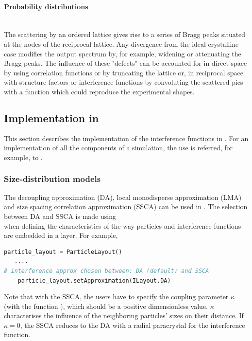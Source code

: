 \paragraph{Probability distributions} \mbox{}\\
The scattering by an ordered lattice gives rise to a series of Bragg peaks situated at the nodes of the reciprocal lattice. Any divergence from the ideal crystalline case modifies the output spectrum by, for example, widening or attenuating the Bragg peaks. The influence of these "defects" can be accounted for 
 in direct space by using correlation functions or by truncating the lattice or, in reciprocal space with structure factors or interference functions by convoluting the scattered pics with a function which could reproduce the experimental shapes.

\subsection{Implementation in \BornAgain}

This section describes the implementation of the interference functions in \BornAgain. For an implementation of all the components of a simulation, the use is referred, for example, to .\\



\subsubsection{Size-distribution models}
The decoupling approximation (DA), local monodisperse approximation (LMA) and size spacing correlation approximation (SSCA) can be used in \BornAgain.
The selection between DA and SSCA is made using\\ 
 when defining the characteristics of the way particles and interference functions are embedded in a layer.  For example,
\begin{lstlisting}[language=python, style=eclipseboxed,numbers=none,nolol]
    particle_layout = ParticleLayout()
   ....
# interference approx chosen between: DA (default) and SSCA
    particle_layout.setApproximation(ILayout.DA)
\end{lstlisting}

Note that with the SSCA, the users have to specify the coupling parameter $\kappa$ (with the function ), which should be a positive dimensionless value. $\kappa$ characterises the influence of the neighboring particles' sizes on their distance. If $\kappa=0$, the SSCA reduces to the DA with a radial paracrystal for the interference function.\\

